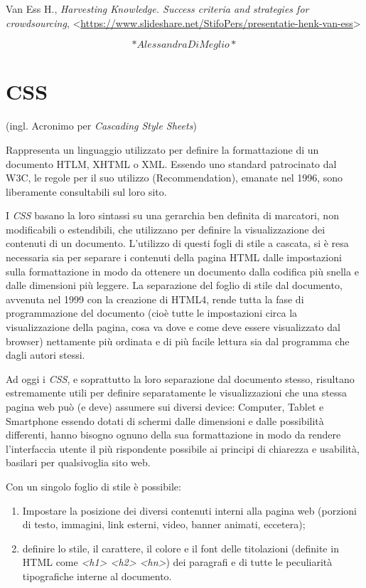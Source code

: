 \documentclass[
  b5paper,
  twoside,
  11pt,
  chapterprefix=false,
  bibliography=totocnumbered,
  parskip=0]{scrbook}
\begin{document}
Van Ess H., \emph{Harvesting Knowledge. Success criteria and strategies for
crowdsourcing},
\textless{}\href{https://www.slideshare.net/StifoPers/presentatie-henk-van-ess}{{https://www.slideshare.net/StifoPers/presentatie-henk-van-ess}}\textgreater{}

\[*Alessandra Di Meglio*\]

\hypertarget{css}{%
\chapter{CSS}\label{css}}

(ingl. Acronimo per \emph{Cascading Style Sheets})

Rappresenta un linguaggio utilizzato per definire la formattazione di un
documento HTLM, XHTML o XML. Essendo uno standard patrocinato dal W3C,
le regole per il suo utilizzo (Recommendation), emanate nel 1996, sono
liberamente consultabili sul loro sito.

I \emph{CSS} basano la loro sintassi su una gerarchia ben definita di
marcatori, non modificabili o estendibili, che utilizzano per definire
la visualizzazione dei contenuti di un documento. L'utilizzo di questi
fogli di stile a cascata, si è resa necessaria sia per separare i
contenuti della pagina HTML dalle impostazioni sulla formattazione in
modo da ottenere un documento dalla codifica più snella e dalle
dimensioni più leggere. La separazione del foglio di stile dal
documento, avvenuta nel 1999 con la creazione di HTML4, rende tutta la
fase di programmazione del documento (cioè tutte le impostazioni circa
la visualizzazione della pagina, cosa va dove e come deve essere
visualizzato dal browser) nettamente più ordinata e di più facile
lettura sia dal programma che dagli autori stessi.

Ad oggi i \emph{CSS}, e soprattutto la loro separazione dal documento stesso,
risultano estremamente utili per definire separatamente le
visualizzazioni che una stessa pagina web può (e deve) assumere sui
diversi device: Computer, Tablet e Smartphone essendo dotati di schermi
dalle dimensioni e dalle possibilità differenti, hanno bisogno ognuno
della sua formattazione in modo da rendere l'interfaccia utente il più
rispondente possibile ai principi di chiarezza e usabilità, basilari per
qualsivoglia sito web.

Con un singolo foglio di stile è possibile:

\begin{enumerate}
\def\labelenumi{\arabic{enumi}.}
\item
  Impostare la posizione dei diversi contenuti interni alla pagina web
  (porzioni di testo, immagini, link esterni, video, banner animati,
  eccetera);
\item
  definire lo stile, il carattere, il colore e il font delle
  titolazioni (definite in HTML come \emph{\textless h1\textgreater{} \textless h2\textgreater{} \textless hn\textgreater{}}) dei
  paragrafi e di tutte le peculiarità tipografiche interne al
  documento.
\end{enumerate}
\end{document}
